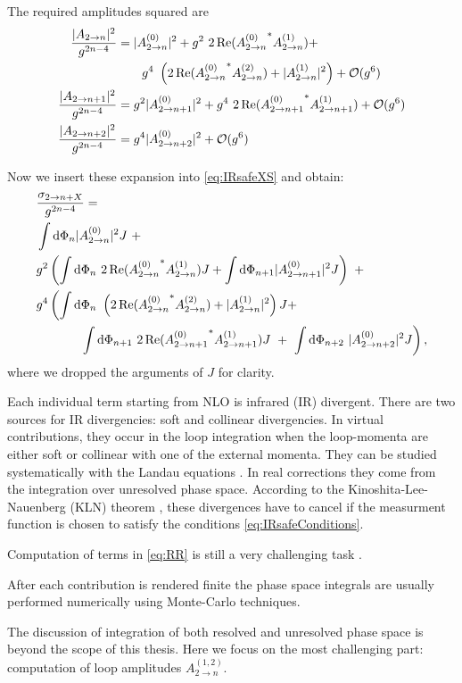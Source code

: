 The required amplitudes squared are
\begin{subequations}
  \begin{align}
    \frac{\vert A_{2\to n} \vert^2}{g^{2n-4}}  &= \vert A^{(0)}_{2\to n} \vert^2 + g^2~2\Re({A^{(0)}_{2\to n}}^{*} A^{(1)}_{2\to n}) + \\ & \qquad g^4~\left(2\Re({A^{(0)}_{2\to n}}^{*} A^{(2)}_{2\to n}) + \vert A^{(1)}_{2\to n} \vert^2 \right)+ \mathcal{O}(g^{6})  \\
    \frac{\vert A_{2\to n+1} \vert^2}{g^{2n-4}} &= g^2 \vert A^{(0)}_{2\to n+1} \vert^2 + g^4~2\Re({A^{(0)}_{2\to n+1}}^{*} A^{(1)}_{2\to n+1}) + \mathcal{O}(g^{6}) \\
    \frac{\vert A_{2\to n+2} \vert^2}{g^{2n-4}} &= g^4 \vert A^{(0)}_{2\to n+2} \vert^2 + \mathcal{O}(g^{6})
  \end{align}
\end{subequations}

Now we insert these expansion into \eqref{eq:IRsafeXS} and obtain:
\begin{subequations}
  \begin{align}
    \nonumber
    & \frac{\sigma_{2\rightarrow n + X}}{g^{2n-4}} = \\
    & \int \dd\Phi_n \vert A^{(0)}_{2\to n} \vert^2 J  ~+ \\
    & g^{2} \left( \int \dd\Phi_n~2\Re({A^{(0)}_{2\to n}}^{*} A^{(1)}_{2\to n}) J  + \int \dd\Phi_{n+1} \vert A^{(0)}_{2\to n+1} \vert^2 J \right) ~+ \\
    & g^{4} \left( \int \dd\Phi_n~ \left( 2\Re({A^{(0)}_{2\to n}}^{*} A^{(2)}_{2\to n}) + \vert A^{(1)}_{2\to n} \vert^2 \right) J   + \right. \\ 
    \label{eq:RR}
    & \hspace{8ex} \left. \int \dd\Phi_{n+1}~ 2\Re({A^{(0)}_{2\to n+1}}^{*} A^{(1)}_{2\to n+1}) J ~+~ \int \dd\Phi_{n+2}~ \vert A^{(0)}_{2\to n+2} \vert^2 J \right),
  \end{align}
\end{subequations}
where we dropped the arguments of $J$ for clarity. 

Each individual term starting from NLO is infrared (IR) divergent.
There are two sources for IR divergencies: soft and collinear divergencies.
In virtual contributions, they occur in the loop integration when the loop-momenta are
either soft or collinear with one of the external momenta.
They can be studied systematically with the Landau equations \cite{Landau1959}.
In real corrections they come from the integration over unresolved phase space.
According to the Kinoshita-Lee-Nauenberg (KLN) theorem \cite{Kinoshita1962,Lee1964},
these divergences have to cancel if the measurment function is chosen to satisfy the conditions \eqref{eq:IRsafeConditions}.

Computation of terms in \eqref{eq:RR} is still a very challenging task .

After each contribution is rendered finite the phase space integrals are usually performed numerically using Monte-Carlo techniques.

The discussion of integration of both resolved and unresolved phase space is beyond the scope of this thesis.
Here we focus on the most challenging part:
computation of loop amplitudes $A^{(1,2)}_{2\to n}$.

